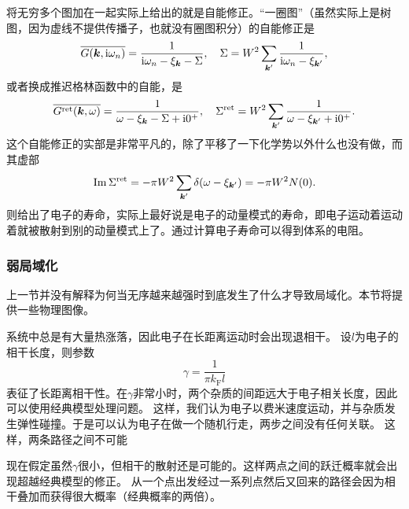 将无穷多个图加在一起实际上给出的就是自能修正。“一圈图”（虽然实际上是树图，因为虚线不提供传播子，也就没有圈图积分）的自能修正是
\begin{equation}
    \overline{G(\vb*{k}, \mathrm{i} \omega_n)} = \frac{1}{\mathrm{i} \omega_n - \xi_{\vb*{k}} - \Sigma} , \quad \Sigma = W^2 \sum_{\vb*{k}'} \frac{1}{\mathrm{i} \omega_n - \xi_{\vb*{k}'}} ,
\end{equation}
或者换成推迟格林函数中的自能，是
\begin{equation}
    \overline{G^\text{ret}(\vb*{k}, \omega)} = \frac{1}{\omega - \xi_{\vb*{k}} - \Sigma + \mathrm{i} 0^+} , \quad \Sigma^\text{ret} = W^2 \sum_{\vb*{k}'} \frac{1}{\omega - \xi_{\vb*{k}'}  + \mathrm{i} 0^+}.
\end{equation}
这个自能修正的实部是非常平凡的，除了平移了一下化学势以外什么也没有做，而其虚部
\begin{equation}
    \Im \Sigma^\text{ret} = - \pi W^2 \sum_{\vb*{k}'} \delta(\omega - \xi_{\vb*{k}'}) = - \pi W^2 N(0).
\end{equation}
则给出了电子的寿命，实际上最好说是电子的动量模式的寿命，即电子运动着运动着就被散射到别的动量模式上了。通过计算电子寿命可以得到体系的电阻。

\subsubsection{弱局域化}

上一节并没有解释为何当无序越来越强时到底发生了什么才导致局域化。本节将提供一些物理图像。

系统中总是有大量热涨落，因此电子在长距离运动时会出现退相干。
设$l$为电子的相干长度，则参数
\begin{equation}
    \gamma = \frac{1}{\pi k_\text{F} l}
\end{equation}
表征了长距离相干性。在$\gamma$非常小时，两个杂质的间距远大于电子相关长度，因此可以使用经典模型处理问题。
这样，我们认为电子以费米速度运动，并与杂质发生弹性碰撞。于是可以认为电子在做一个随机行走，两步之间没有任何关联。
这样，两条路径之间不可能

现在假定虽然$\gamma$很小，但相干的散射还是可能的。这样两点之间的跃迁概率就会出现超越经典模型的修正。
从一个点出发经过一系列点然后又回来的路径会因为相干叠加而获得很大概率（经典概率的两倍）。

